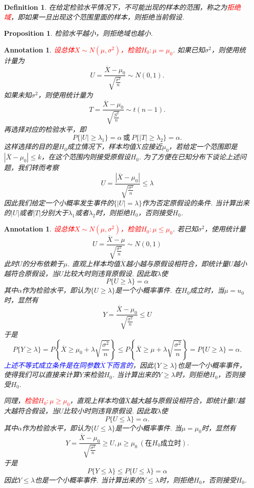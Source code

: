 \documentclass{article}
\newtheorem{proposition}[theorem]{Proposition}
\newtheorem{definition}[theorem]{Definition}
\newtheorem{annotation}[theorem]{Annotation}
\newcommand{\redt}[1]{\textcolor{red}{#1}}
\newcommand{\bluet}[1]{\textcolor{blue}{#1}}
\begin{document}
\begin{definition}
\rm 在给定检验水平情况下，不可能出现的样本的范围，称之为\redt{拒绝域}，即如果一旦出现这个范围里面的样本，则拒绝当前假设. 
\end{definition}

\begin{proposition}
\rm 检验水平越小，则拒绝域也越小. 
\end{proposition}

\begin{annotation}
\rm \redt{设总体$X \sim N(\mu,\sigma^2)$，检验$H_0: \mu=\mu_0$}. 如果已知$\sigma^2$，则使用统计量为
$$
U = \frac{\overline{X}-\mu_0}{\sqrt{\frac{\sigma^2}{n}}} \sim N(0,1).
$$
如果未知$\sigma^2$，则使用统计量为
$$
T = \frac{\overline{X}-\mu_0}{\sqrt{\frac{S^2}{n}}} \sim t(n-1).
$$
再选择对应的检验水平，即
$$
P\{|U| \geq \lambda_1 \} = \alpha~\text{或} ~ P\{|T| \geq \lambda_2 \} = \alpha.
$$
这样选择的目的是$H_0$成立情况下，样本均值$\overline{X}$应接近$\mu_0$，若给定一个范围即是$|\overline{X} - \mu_0| \leq k$，在这个范围内则接受原假设$H_0$. 为了方便在已知分布下谈论上述问题，我们转而考察
$$
U = \frac{|\overline{X} - \mu_0|}{\sqrt{\frac{\sigma^2}{n}}} \leq \lambda
$$
因此我们给定一个小概率发生事件的$\{|U|=\lambda\}$作为否定原假设的条件. 
当计算出来的$|U|$或者$|T|$分别大于$\lambda_1$或者$\lambda_2$时，则拒绝$H_0$，否则接受$H_0$.
\end{annotation}

\begin{annotation}
\rm \redt{设总体$X \sim N(\mu,\sigma^2)$，检验$H_0: \mu \leq \mu_0$}. 若已知$\sigma^2$，使用统计量
$$
U = \frac{\overline{X}-\mu}{\sqrt{\frac{\sigma^2}{n}}} \sim N(0,1)
$$
此时$U$的分布依赖于$\mu$. 直观上样本均值$\overline{X}$越小越与原假设相符合，即统计量$U$越小越符合原假设，当$U$比较大时则违背原假设. 因此取$\lambda$使
$$
P\{U \geq \lambda\} = \alpha
$$
其中$\alpha$作为检验水平，即认为$\{U \geq \lambda\}$是一个小概率事件. 在$H_0$成立时，当$\mu = u_0$时，显然有
$$
Y = \frac{\overline{X}-\mu_0}{\sqrt{\frac{\sigma^2}{n}}} \leq U
$$
于是
$$
P\{Y \geq \lambda \} = P\left\{\overline{X} \geq \mu_0 + \lambda\sqrt{\frac{\sigma^2}{n}}\right\} \leq P\left\{ \overline{X} \geq \mu + \lambda\sqrt{\frac{\sigma^2}{n}} \right\} = P\{U \geq \lambda\} = \alpha.
$$ 
\bluet{上述不等式成立条件是在同参数$\overline{X}$下而言的}，因此$\{Y \geq \lambda\}$也是一个小概率事件，使得我们可以直接来计算$Y$来检验$H_0$. 当计算出来的$Y \geq \lambda$时，则拒绝$H_0$，否则接受$H_0$. 

同理，\redt{检验$H_0: \mu \geq \mu_0$}，直观上样本均值$\overline{X}$越大越与原假设相符合，即统计量$U$越大越符合假设，当$U$比较小时则违背原假设. 因此取$\lambda$使
$$
P\{U \leq \lambda \} = \alpha.
$$
其中$\alpha$作为检验水平，即认为$\{U \leq \lambda\}$是一个小概率事件. 当$\mu=\mu_0$时，显然有
$$
Y = \frac{\overline{X}-\mu_0}{\sqrt{\frac{\sigma^2}{n}}} \geq U , \mu \geq \mu_0  ~(\text{在$H_0$成立时}).
$$
于是
$$
P\{Y \leq \lambda \} \leq P\{U \leq \lambda\} = \alpha
$$
因此${Y \leq \lambda}$也是一个小概率事件. 当计算出来的$Y \leq \lambda$时，则拒绝$H_0$，否则接受$H_0$.
\end{annotation}
\end{document}

